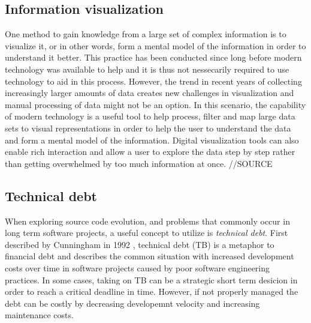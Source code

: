 \subsection{Information visualization}
One method to gain knowledge from a large set of complex information is to visualize it, or in other words, form a mental model of the information in order to understand it better. \cite{spence_information_2014}
This practice has been conducted since long before modern technology was available to help and it is thus not nessecarily required to use technology to aid in this process. \cite{friendly_brief_2008}
However, the trend in recent years of collecting increasingly larger amounts of data creates new challenges in visualization and manual processing of data might not be an option. 
In this scenario, the capability of modern technology is a useful tool to help process, filter and map large data sets to visual representations in order to help the user to understand the data and form a mental model of the information. \cite{card_structure_1997}
Digital visualization tools can also enable rich interaction and allow a user to explore the data step by step rather than getting overwhelmed by too much information at once. //SOURCE

\subsection{Technical debt}
When exploring source code evolution, and problems that commonly occur in long term software projects, a useful concept to utilize is \textit{technical debt}.
First described by Cunningham in 1992 \cite{cunningham_wycash_1992}, technical debt (TB) is a metaphor to financial debt and describes the common situation with increased development costs over time in software projects caused by poor software engineering practices. \cite{tom_exploration_2013}
In some cases, taking on TB can be a strategic short term desicion in order to reach a critical deadline in time.
However, if not properly managed the debt can be costly by decreasing developemnt velocity and increasing maintenance costs. \cite{seaman_using_2012}

